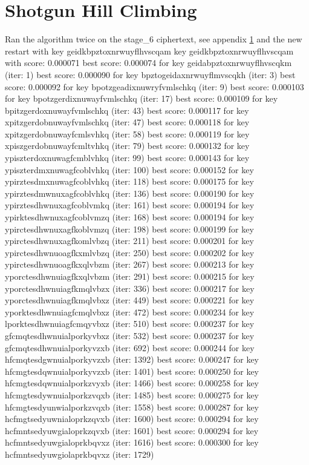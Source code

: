 \documentclass[]{article}
\begin{document}
\section{Shotgun Hill Climbing}
Ran the algorithm twice on the stage\_6 ciphertext, see appendix \ref{} and the 
new restart with key geidkbpztoxnrwuyflhvscqam
key geidkbpztoxnrwuyflhvscqam with score: 0.000071
best score: 0.000074 for key geidabpztoxnrwuyflhvscqkm (iter: 1)
best score: 0.000090 for key bpztogeidaxnrwuyflmvscqkh (iter: 3)
best score: 0.000092 for key bpotzgeadixnuwryfvmlschkq (iter: 9)
best score: 0.000103 for key bpotzgerdixnuwayfvmlschkq (iter: 17)
best score: 0.000109 for key bpitzgerdoxnuwayfvmlschkq (iter: 43)
best score: 0.000117 for key xpitzgerdobnuwayfvmlschkq (iter: 47)
best score: 0.000118 for key xpitzgerdobnuwayfcmlsvhkq (iter: 58)
best score: 0.000119 for key xpiszgerdobnuwayfcmltvhkq (iter: 79)
best score: 0.000132 for key ypiszterdoxnuwagfcmblvhkq (iter: 99)
best score: 0.000143 for key ypiszterdmxnuwagfcoblvhkq (iter: 100)
best score: 0.000152 for key ypirztesdmxnuwagfcoblvhkq (iter: 118)
best score: 0.000175 for key ypirztesdmwnuxagfcoblvhkq (iter: 136)
best score: 0.000190 for key ypirztesdhwnuxagfcoblvmkq (iter: 161)
best score: 0.000194 for key ypirktesdhwnuxagfcoblvmzq (iter: 168)
best score: 0.000194 for key ypirctesdhwnuxagfkoblvmzq (iter: 198)
best score: 0.000199 for key ypirctesdhwnuxagfkomlvbzq (iter: 211)
best score: 0.000201 for key ypirctesdhwnuoagfkxmlvbzq (iter: 250)
best score: 0.000202 for key ypirctesdhwnuoagfkxqlvbzm (iter: 267)
best score: 0.000213 for key yporctesdhwnuiagfkxqlvbzm (iter: 291)
best score: 0.000215 for key yporctesdhwnuiagfkmqlvbzx (iter: 336)
best score: 0.000217 for key yporctesdhwnuiagfkmqlvbxz (iter: 449)
best score: 0.000221 for key yporktesdhwnuiagfcmqlvbxz (iter: 472)
best score: 0.000234 for key lporktesdhwnuiagfcmqyvbxz (iter: 510)
best score: 0.000237 for key gfcmqtesdhwnuialporkyvbxz (iter: 532)
best score: 0.000237 for key gfcmqtesdhwnuialporkyvzxb (iter: 692)
best score: 0.000244 for key hfcmqtesdgwnuialporkyvzxb (iter: 1392)
best score: 0.000247 for key hfcmgtesdqwnuialporkyvzxb (iter: 1401)
best score: 0.000250 for key hfcmgtesdqwnuialporkzvyxb (iter: 1466)
best score: 0.000258 for key hfcmgtesdywnuialporkzvqxb (iter: 1485)
best score: 0.000275 for key hfcmgtesdyunwialporkzvqxb (iter: 1558)
best score: 0.000287 for key hcfmgtsedyuwnialoprkzqvxb (iter: 1600)
best score: 0.000294 for key hcfmntsedyuwgialoprkzqvxb (iter: 1601)
best score: 0.000294 for key hcfmntsedyuwgialoprkbqvxz (iter: 1616)
best score: 0.000300 for key hcfmntsedyuwgiolaprkbqvxz (iter: 1729)
\end{document}
